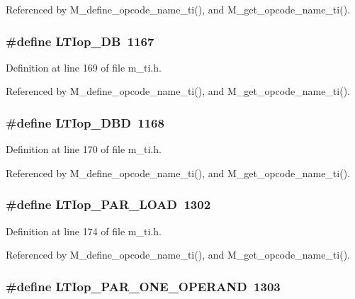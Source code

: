 Referenced by M\_\-define\_\-opcode\_\-name\_\-ti(), and M\_\-get\_\-opcode\_\-name\_\-ti().
\subsubsection{\setlength{\rightskip}{0pt plus 5cm}\#define LTIop\_\-DB~1167}\label{m__ti_8h_29b731370d016cfe08d0940cc8ea8e8a}




Definition at line 169 of file m\_\-ti.h.

Referenced by M\_\-define\_\-opcode\_\-name\_\-ti(), and M\_\-get\_\-opcode\_\-name\_\-ti().
\subsubsection{\setlength{\rightskip}{0pt plus 5cm}\#define LTIop\_\-DBD~1168}\label{m__ti_8h_5b00f4d158ee01b18135b0bba341062c}




Definition at line 170 of file m\_\-ti.h.

Referenced by M\_\-define\_\-opcode\_\-name\_\-ti(), and M\_\-get\_\-opcode\_\-name\_\-ti().
\subsubsection{\setlength{\rightskip}{0pt plus 5cm}\#define LTIop\_\-PAR\_\-LOAD~1302}\label{m__ti_8h_de5b4fe769ddce553a58502df2ba3cfb}




Definition at line 174 of file m\_\-ti.h.

Referenced by M\_\-define\_\-opcode\_\-name\_\-ti(), and M\_\-get\_\-opcode\_\-name\_\-ti().
\subsubsection{\setlength{\rightskip}{0pt plus 5cm}\#define LTIop\_\-PAR\_\-ONE\_\-OPERAND~1303}\label{m__ti_8h_ed041313fda3c8a27312f01da1550274}




